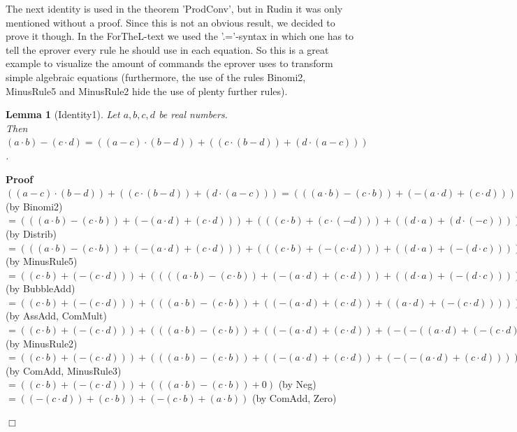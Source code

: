\documentclass{article}
\newenvironment{forthel}{\begin{leftbar}}{\end{leftbar}}
\newenvironment{proof}{\noindent\textbf{Proof\ }}{\hspace*{\fill}$\Box$\medskip}
\newtheorem{lemma}{Lemma}
\newcommand{\dotequal}{=}
\begin{document}
\noindent The next identity is used in the theorem 'ProdConv', but in Rudin it was only mentioned without a proof. Since this is not an obvious result, we decided to prove it though. In the ForTheL-text we used the '.='-syntax in which one has to tell the eprover every rule he should use in each equation.
So this is a great example to visualize the amount of commands the eprover uses to transform simple algebraic equations (furthermore, the use of the rules Binomi2, MinusRule5 and MinusRule2 hide the use of plenty further rules).

\begin{forthel}
	
	\begin{lemma}[Identity1]
	Let $a,b,c,d$ be real numbers. 
	\\Then $(a \cdot b) - (c \cdot d) = ((a - c) \cdot (b - d)) + ((c \cdot (b - d)) + (d \cdot (a - c)))$.
	\end{lemma}
	\begin{proof}
	$((a - c) \cdot (b - d)) + ((c \cdot (b - d)) + (d \cdot (a - c))) 
	\dotequal (((a \cdot b) - (c \cdot b)) + (-(a \cdot d) + (c \cdot d))) + ((c \cdot (b - d)) + (d \cdot (a - c)))$ (by Binomi2)
	\\$\dotequal (((a \cdot b) - (c \cdot b)) + (-(a \cdot d) + (c \cdot d))) + (((c \cdot b) + (c \cdot (-d))) + ((d \cdot a) + (d \cdot (-c))))$ (by Distrib)
	\\$\dotequal (((a \cdot b) - (c \cdot b)) + (-(a \cdot d) + (c \cdot d))) + (((c \cdot b) + (-(c \cdot d))) + ((d \cdot a) + (-(d \cdot c))))$ (by MinusRule5)
	\\$\dotequal ((c \cdot b) + (-(c \cdot d))) + ((((a \cdot b) - (c \cdot b)) + (-(a \cdot d) + (c \cdot d))) + ((d \cdot a) + (-(d \cdot c))))$ (by BubbleAdd)
	\\$\dotequal ((c \cdot b) + (-(c \cdot d))) + (((a \cdot b) - (c \cdot b)) + ((-(a \cdot d) + (c \cdot d)) + ((a \cdot d) + (-(c \cdot d)))))$ (by AssAdd, ComMult)
	\\$\dotequal ((c \cdot b) + (-(c \cdot d))) + (((a \cdot b) - (c \cdot b)) + ((-(a \cdot d) + (c \cdot d)) + (-(-((a \cdot d) + (-(c \cdot d)))))))$ (by MinusRule2)
	\\$\dotequal ((c \cdot b) + (-(c \cdot d))) + (((a \cdot b) - (c \cdot b)) + ((-(a \cdot d) + (c \cdot d)) + (-(-(a \cdot d) + (c \cdot d)))))$ (by ComAdd, MinusRule3)
	\\$\dotequal ((c \cdot b) + (-(c \cdot d))) + (((a \cdot b) - (c \cdot b)) + 0)$ (by Neg)
	\\$\dotequal ((-(c \cdot d)) + (c \cdot b)) + (-(c \cdot b) + (a \cdot b))$ (by ComAdd, Zero)

\end{proof}
\end{forthel}
\end{document}
